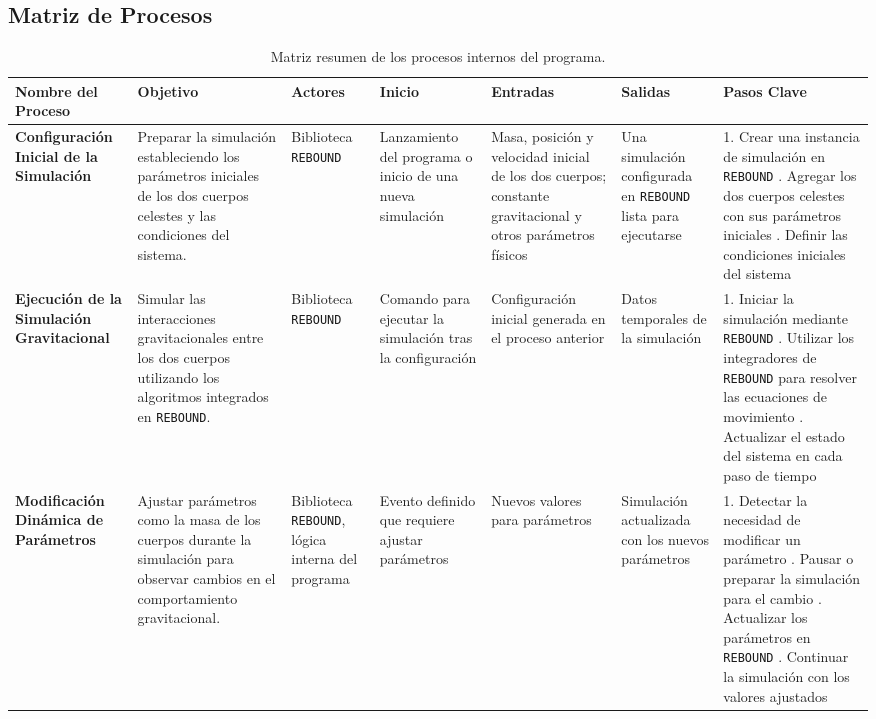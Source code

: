 \subsection{Matriz de Procesos}
\begin{table}[H]
    \centering
    \caption{Matriz resumen de los procesos internos del programa.}
    \label{tab:matriz_procesos}
    \begin{adjustbox}{max width=\textwidth}
        \begin{tabular}{@{}p{5cm} p{3cm} p{2.5cm} p{2.5cm} p{2.5cm} p{3cm} p{4cm}@{}}
            \toprule
            \textbf{Nombre del Proceso} & \textbf{Objetivo} & \textbf{Actores} & \textbf{Inicio} & \textbf{Entradas} & \textbf{Salidas} & \textbf{Pasos Clave} \\
            \midrule
            \textbf{Configuración Inicial de la Simulación} & Preparar la simulación estableciendo los parámetros iniciales de los dos cuerpos celestes y las condiciones del sistema. & Biblioteca \texttt{REBOUND} & Lanzamiento del programa o inicio de una nueva simulación & Masa, posición y velocidad inicial de los dos cuerpos; constante gravitacional y otros parámetros físicos & Una simulación configurada en \texttt{REBOUND} lista para ejecutarse & 1. Crear una instancia de simulación en \texttt{REBOUND} \newline 2. Agregar los dos cuerpos celestes con sus parámetros iniciales \newline 3. Definir las condiciones iniciales del sistema \\
            \midrule
            \textbf{Ejecución de la Simulación Gravitacional} & Simular las interacciones gravitacionales entre los dos cuerpos utilizando los algoritmos integrados en \texttt{REBOUND}. & Biblioteca \texttt{REBOUND} & Comando para ejecutar la simulación tras la configuración & Configuración inicial generada en el proceso anterior & Datos temporales de la simulación & 1. Iniciar la simulación mediante \texttt{REBOUND} \newline 2. Utilizar los integradores de \texttt{REBOUND} para resolver las ecuaciones de movimiento \newline 3. Actualizar el estado del sistema en cada paso de tiempo \\
            \midrule
            \textbf{Modificación Dinámica de Parámetros} & Ajustar parámetros como la masa de los cuerpos durante la simulación para observar cambios en el comportamiento gravitacional. & Biblioteca \texttt{REBOUND}, lógica interna del programa & Evento definido que requiere ajustar parámetros & Nuevos valores para parámetros & Simulación actualizada con los nuevos parámetros & 1. Detectar la necesidad de modificar un parámetro \newline 2. Pausar o preparar la simulación para el cambio \newline 3. Actualizar los parámetros en \texttt{REBOUND} \newline 4. Continuar la simulación con los valores ajustados \\

\end{tabular}
\end{adjustbox}
\end{table}
